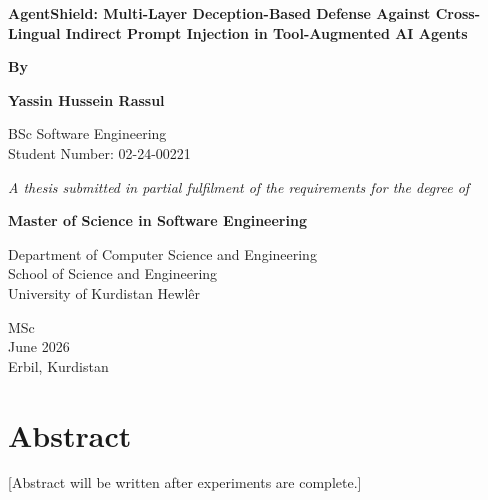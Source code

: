 \documentclass[12pt,a4paper,oneside]{report}
\begin{document}
\setcounter{page}{1}  %

\begin{titlepage}
\centering
\vspace*{2cm}
{\fontsize{18}{21.6}\selectfont\bfseries AgentShield: Multi-Layer Deception-Based Defense Against Cross-Lingual Indirect Prompt Injection in Tool-Augmented AI Agents\par}
\vspace{2cm}
{\fontsize{16}{19.2}\selectfont\bfseries By\par}
\vspace{0.5cm}
{\fontsize{16}{19.2}\selectfont\bfseries Yassin Hussein Rassul\par}
\vspace{0.5cm}
{\fontsize{12}{14.4}\selectfont BSc Software Engineering\\Student Number: 02-24-00221\par}
\vspace{1cm}
{\fontsize{12}{14.4}\selectfont\itshape A thesis submitted in partial fulfilment of the requirements for the degree of\par}
\vspace{0.5cm}
{\fontsize{14}{16.8}\selectfont\bfseries Master of Science in Software Engineering\par}
\vspace{1.5cm}
{\fontsize{13}{15.6}\selectfont
Department of Computer Science and Engineering\\
School of Science and Engineering\\
University of Kurdistan Hewl\^{e}r\par}
\vspace{1cm}
{\fontsize{13}{15.6}\selectfont
MSc\\
June 2026\\
Erbil, Kurdistan\par}
\end{titlepage}


\clearpage
{}
\setcounter{page}{2}

\chapter*{Abstract}
[Abstract will be written after experiments are complete.]
\end{document}
